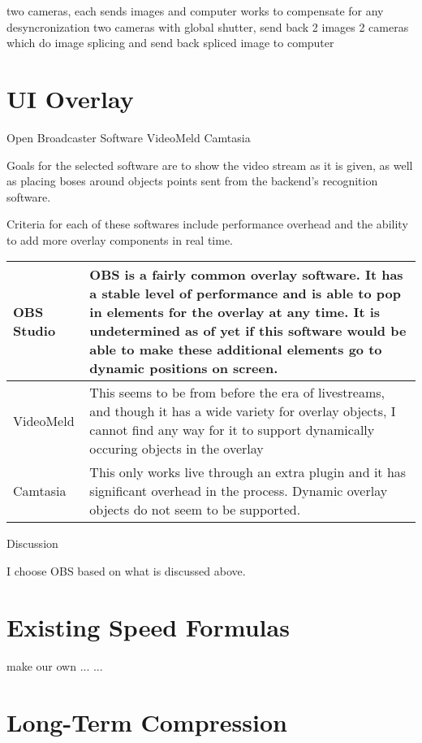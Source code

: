 \documentclass[letterpaper,10pt,onecolumn,draftclsnofoot]{IEEEtran}
\begin{document}
two cameras, each sends images and computer works to compensate for any desyncronization
two cameras with global shutter, send back 2 images
2 cameras which do image splicing and send back spliced image to computer

\section{UI Overlay} %

Open Broadcaster Software
VideoMeld
Camtasia

Goals for the selected software are to show the video stream as it is given, as well as placing boses around objects points sent from the backend's recognition software.

Criteria for each of these softwares include performance overhead and the ability to add more overlay components in real time.

\begin{tabular}{ l l }
  OBS Studio & OBS is a fairly common overlay software.  It has a stable level of performance and is able to pop in elements for the overlay at any time.  It is undetermined as of yet if this software would be able to make these additional elements go to dynamic positions on screen. \\ \hline
  VideoMeld & This seems to be from before the era of livestreams, and though it has a wide variety for overlay objects, I cannot find any way for it to support dynamically occuring objects in the overlay  \\ \hline
  Camtasia & This only works live through an extra plugin and it has significant overhead in the process.  Dynamic overlay objects do not seem to be supported. \\
\end{tabular}

Discussion

I choose OBS based on what is discussed above.


\section{Existing Speed Formulas} %

make our own
...
...

\section{Long-Term Compression} %
\end{document}
